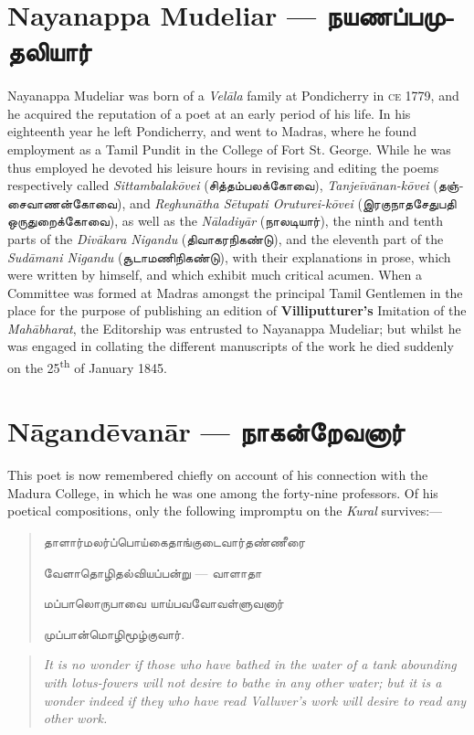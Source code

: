 \documentclass{article}
\newcommand{\TamilText}[1]{\texttamil{#1}}
\newcommand{\TamilBold}[1]{\texttamil{\textbf{#1}}}
\newcommand{\tam}[1]{\TamilText{#1}}
\newcommand{\tambold}[1]{\TamilBold{#1}}
\begin{document}
\section{Nayanappa Mudeliar --- \tambold{நயணப்பமுதலியார்}}
\paragraph{}
Nayanappa Mudeliar was born of a \emph{Vel\={a}la} family at Pondicherry in \textsc{ce} 1779, and he acquired the reputation of a poet at an early period of his life. In his eighteenth year he left Pondicherry, and went to Madras, where he found employment as a Tamil Pundit in the College of Fort St. George. While he was thus employed he devoted his leisure hours in revising and editing the poems respectively called \emph{Sittambalak\={o}vei} (\tam{சித்தம்பலக்கோவை}), \emph{Tanje\={i}v\={a}nan-k\={o}vei} (\tam{தஞ்சைவாணன்கோவை}), and \emph{Reghun\={a}tha S\={e}tupati Oruturei-k\={o}vei} (\tam{இரகுநாதசேதுபதி ஒருதுறைக்கோவை}), as well as the \emph{N\={a}ladiy\={a}r} (\tam{நாலடியார்}), the ninth and tenth parts of the \emph{Div\={a}kara Nigandu} (\tam{திவாகரநிகண்டு}), and the eleventh part of the \emph{Sud\={a}mani Nigandu} (\tam{சூடாமணிநிகண்டு}), with their explanations in prose, which were written by himself, and which exhibit much critical acumen. When a Committee was formed at Madras amongst the principal Tamil Gentlemen in the place for the purpose of publishing an edition of \textbf{Villiputturer's} Imitation of the \emph{Mah\={a}bharat}, the Editorship was entrusted to Nayanappa Mudeliar; but whilst he was engaged in collating the different manuscripts of the work he died suddenly on the 25\textsuperscript{th} of January 1845.

\section{N\={a}gand\={e}van\={a}r --- \tambold{நாகன்றேவனார்}}
\paragraph{}
This poet is now remembered chiefly on account of his connection with the Madura College, in which he was one among the forty-nine professors. Of his poetical compositions, only the following impromptu on the \emph{Kural} survives:---
\begin{quotation}\small
\tam{தாளார்மலர்ப்பொய்கைதாங்குடைவார்தண்ணீரை}

\tam{வேளாதொழிதல்வியப்பன்று} --- \tam{வாளாதா}

\tam{மப்பாலொருபாவை யாய்பவவோவள்ளுவனார்‌}

\tam{முப்பான்மொழிமூழ்குவார்‌}.
\end{quotation}
\begin{quotation}\small
\emph{It is no wonder if those who have bathed in the water of a tank abounding with lotus-fowers will not desire to bathe in any other water; but it is a wonder indeed if they who have read Valluver's work will desire to read any other work.}
\end{quotation}
\end{document}
